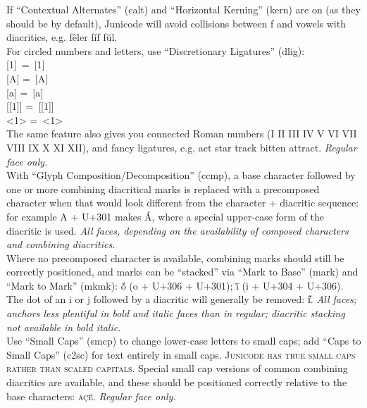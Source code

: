 \documentclass[a4paper]{article}
\begin{document}
\noindent If “Contextual Alternates” (calt) and “Horizontal Kerning” (kern)
are on (as they should be by default), Junicode will avoid collisions
between f and vowels with diacritics, e.g.  fêler fíf fŭl.\\

\noindent For circled numbers and letters, use “Discretionary Ligatures” (dlig):\\
\hspace*{10pt}[1] {= [1]}\\
\hspace*{10pt}[A] {= [A]}\\
\hspace*{10pt}[a] {= [a]}\\
\hspace*{10pt}[[1]] {= [[1]]}\\
\hspace*{10pt}<1> {= <1>}\\
The same feature also gives you connected Roman numbers
{(I II III IV V VI VII VIII IX X XI
  XII), and fancy ligatures, e.g. act star track bitten attract.}
{\itshape Regular face only.}\\

\noindent With “Glyph Composition/Decomposition” (ccmp), a base
character followed by one or more combining diacritical marks is
replaced with a precomposed character when that would look different
from the character + diacritic sequence: for example A + U+301 makes Á,
where a special upper-case form of the diacritic is used. {\itshape
  All faces, depending on the availability of composed characters and
  combining diacritics.}\\

\noindent Where no precomposed character is available, combining marks should
still be correctly positioned, and marks can be “stacked” via “Mark
to Base” (mark) and “Mark to Mark” (mkmk): ŏ́ (o + U+306 + U+301);
ī̆ (i + U+304 + U+306).  The dot of an i or j followed by a diacritic
will generally be removed: i̽. {\itshape All faces; anchors less
  plentiful in bold and italic faces than in regular; diacritic
  stacking not available in bold italic.}\\

\noindent Use “Small Caps” (smcp) to change lower-case letters to
small caps; add “Caps to Small Caps” (c2sc) for text entirely in small
caps. {\scshape Junicode has true small caps rather than scaled
  capitals.} Special small cap versions of common combining diacritics
are available, and these should be positioned correctly relative to
the base characters: {\scshape äçé}. {\itshape Regular face
  only.}\\
\end{document}
